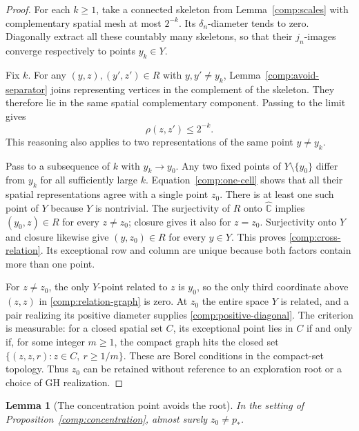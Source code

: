 \documentclass[11pt]{article}
\numberwithin{equation}{section}
\newtheorem{lemma}[theorem]{Lemma}
\theoremstyle{definition}
\theoremstyle{remark}
\newcommand{\1}{\mathbf 1}
\begin{document}
\begin{proof}
For each $k\ge1$, take a connected skeleton from
Lemma~\ref{comp:scales} with complementary spatial mesh at most
$2^{-k}$.  Its $\delta_n$-diameter tends to zero.  Diagonally
extract all these countably many skeletons, so that their
$j_n$-images converge respectively to points $y_k\in Y$.

Fix $k$.  For any $(y,z),(y',z')\in R$ with $y,y'\ne y_k$,
Lemma~\ref{comp:avoid-separator} joins representing vertices in
the complement of the skeleton.  They therefore lie in the same
spatial complementary component.  Passing to the limit gives
\begin{equation}
 \label{comp:one-cell}
 \rho(z,z')\le2^{-k}.
\end{equation}
This reasoning also applies to two representations of the same
point $y\ne y_k$.

Pass to a subsequence of $k$ with $y_k\to y_0$.  Any two fixed
points of $Y\setminus\{y_0\}$ differ from $y_k$ for all sufficiently
large $k$.  Equation~\eqref{comp:one-cell} shows that all their
spatial representations agree with a single point $z_0$.  There
is at least one such point of $Y$ because $Y$ is nontrivial.  The
surjectivity of $R$ onto $\widehat{\mathbb C}$ implies
$(y_0,z)\in R$ for every $z\ne z_0$; closure gives it also for
$z=z_0$.  Surjectivity onto $Y$ and closure likewise give
$(y,z_0)\in R$ for every $y\in Y$.  This proves
\eqref{comp:cross-relation}.  Its exceptional row and column are
unique because both factors contain more than one point.

For $z\ne z_0$, the only $Y$-point related to $z$ is $y_0$, so
the only third coordinate above $(z,z)$ in
\eqref{comp:relation-graph} is zero.  At $z_0$ the entire space $Y$
is related, and a pair realizing its positive diameter supplies
\eqref{comp:positive-diagonal}.  The criterion is measurable:
for a closed spatial set $C$, its exceptional point lies in $C$
if and only if, for some integer $m\ge1$, the compact graph hits
the closed set $\{(z,z,r):z\in C,\ r\ge1/m\}$.  These are Borel
conditions in the compact-set topology.  Thus $z_0$ can be retained
without reference to an exploration root or a choice of GH
realization.
\end{proof}

\begin{lemma}[The concentration point avoids the root]
\label{comp:root-avoidance}
In the setting of Proposition~\ref{comp:concentration}, almost
surely $z_0\ne p_*$.
\end{lemma}
\end{document}

